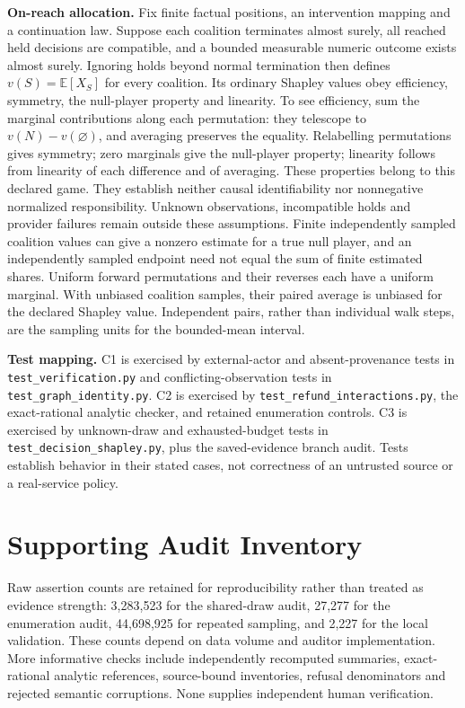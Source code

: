 \documentclass[conference]{IEEEtran}
\begin{document}
\textbf{On-reach allocation.} Fix finite factual positions, an intervention
mapping and a continuation law. Suppose each coalition terminates almost surely,
all reached held decisions are compatible, and a bounded measurable numeric
outcome exists almost surely. Ignoring holds beyond normal termination then
defines $v(S)=\mathbb{E}[X_S]$ for every coalition. Its ordinary Shapley values
obey efficiency, symmetry, the null-player property and linearity. To see
efficiency, sum the marginal contributions along each permutation: they
telescope to $v(N)-v(\varnothing)$, and averaging preserves the equality.
Relabelling permutations gives symmetry; zero marginals give the null-player
property; linearity follows from linearity of each difference and of averaging.
These properties belong to this declared game. They establish neither causal
identifiability nor nonnegative normalized responsibility. Unknown observations,
incompatible holds and provider failures remain outside these assumptions.
Finite independently sampled coalition values can give a nonzero estimate for
a true null player, and an independently sampled endpoint need not equal the
sum of finite estimated shares.
Uniform forward permutations and their reverses each have a uniform marginal.
With unbiased coalition samples, their paired average is unbiased for the
declared Shapley value. Independent pairs, rather than individual walk steps,
are the sampling units for the bounded-mean interval.

\textbf{Test mapping.} C1 is exercised by external-actor and absent-provenance
tests in \texttt{test\_verification.py} and conflicting-observation tests in
\texttt{test\_graph\_identity.py}. C2 is exercised by
\texttt{test\_refund\_interactions.py}, the exact-rational analytic checker,
and retained enumeration controls. C3 is exercised by unknown-draw and
exhausted-budget tests in \texttt{test\_decision\_shapley.py}, plus the
saved-evidence branch audit. Tests establish behavior in their stated cases,
not correctness of an untrusted source or a real-service policy.

\section{Supporting Audit Inventory}
Raw assertion counts are retained for reproducibility rather than treated as
evidence strength: 3,283,523 for the shared-draw audit, 27,277 for the enumeration
audit, 44,698,925 for repeated sampling, and 2,227 for the local validation.
These counts depend on data volume and auditor implementation. More informative
checks include independently recomputed summaries, exact-rational analytic
references, source-bound inventories, refusal denominators and rejected
semantic corruptions. None supplies independent human verification.
\end{document}
